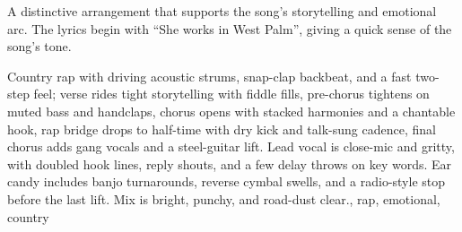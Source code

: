 

\begin{notes}
A distinctive arrangement that supports the song's storytelling and emotional arc. %
The lyrics begin with “She works in West Palm”, giving a quick sense of the song’s tone.
\end{notes}

\begin{style}
Country rap with driving acoustic strums, snap-clap backbeat, and a fast two-step feel; verse rides tight storytelling with fiddle fills, pre-chorus tightens on muted bass and handclaps, chorus opens with stacked harmonies and a chantable hook, rap bridge drops to half-time with dry kick and talk-sung cadence, final chorus adds gang vocals and a steel-guitar lift. %
Lead vocal is close-mic and gritty, with doubled hook lines, reply shouts, and a few delay throws on key words. %
Ear candy includes banjo turnarounds, reverse cymbal swells, and a radio-style stop before the last lift. %
Mix is bright, punchy, and road-dust clear., rap, emotional, country
\end{style}


